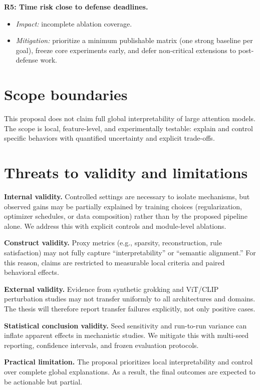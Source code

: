 \documentclass[../../ppgc-prop-tese.tex]{subfiles}
\begin{document}
\textbf{R5: Time risk close to defense deadlines.}
\begin{itemize}
    \item \textit{Impact:} incomplete ablation coverage.
    \item \textit{Mitigation:} prioritize a minimum publishable matrix (one strong baseline per goal), freeze core experiments early, and defer non-critical extensions to post-defense work.
\end{itemize}

\section{Scope boundaries}
This proposal does not claim full global interpretability of large attention models. The scope is local, feature-level, and experimentally testable: explain and control specific behaviors with quantified uncertainty and explicit trade-offs.

\section{Threats to validity and limitations}
\textbf{Internal validity.}
Controlled settings are necessary to isolate mechanisms, but observed gains may be partially explained by training choices (regularization, optimizer schedules, or data composition) rather than by the proposed pipeline alone. We address this with explicit controls and module-level ablations.

\textbf{Construct validity.}
Proxy metrics (e.g., sparsity, reconstruction, rule satisfaction) may not fully capture ``interpretability'' or ``semantic alignment.'' For this reason, claims are restricted to measurable local criteria and paired behavioral effects.

\textbf{External validity.}
Evidence from synthetic grokking and ViT/CLIP perturbation studies \cite{carvalho2025inducing_grokking_distribution_shifts,carvalho2026interpretable_stego_detection_sae} may not transfer uniformly to all architectures and domains. The thesis will therefore report transfer failures explicitly, not only positive cases.

\textbf{Statistical conclusion validity.}
Seed sensitivity and run-to-run variance can inflate apparent effects in mechanistic studies. We mitigate this with multi-seed reporting, confidence intervals, and frozen evaluation protocols.

\textbf{Practical limitation.}
The proposal prioritizes local interpretability and control over complete global explanations. As a result, the final outcomes are expected to be actionable but partial.
\end{document}
